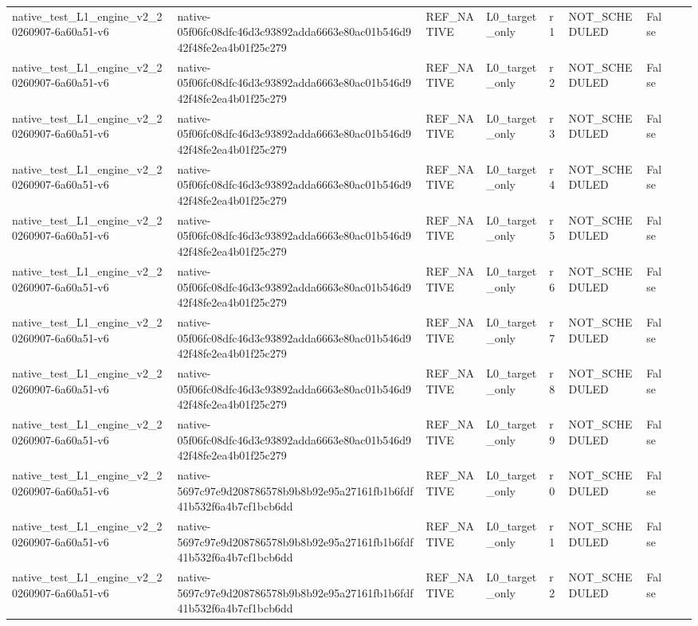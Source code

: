 \begin{tabular}{lllllllll}
native\_test\_L1\_engine\_v2\_20260907-6a60a51-v6 & native-05f06fc08dfc46d3c93892adda6663e80ac01b546d942f48fe2ea4b01f25c279 & REF\_NATIVE & L0\_target\_only & r1 & NOT\_SCHEDULED & False &  &  \\
native\_test\_L1\_engine\_v2\_20260907-6a60a51-v6 & native-05f06fc08dfc46d3c93892adda6663e80ac01b546d942f48fe2ea4b01f25c279 & REF\_NATIVE & L0\_target\_only & r2 & NOT\_SCHEDULED & False &  &  \\
native\_test\_L1\_engine\_v2\_20260907-6a60a51-v6 & native-05f06fc08dfc46d3c93892adda6663e80ac01b546d942f48fe2ea4b01f25c279 & REF\_NATIVE & L0\_target\_only & r3 & NOT\_SCHEDULED & False &  &  \\
native\_test\_L1\_engine\_v2\_20260907-6a60a51-v6 & native-05f06fc08dfc46d3c93892adda6663e80ac01b546d942f48fe2ea4b01f25c279 & REF\_NATIVE & L0\_target\_only & r4 & NOT\_SCHEDULED & False &  &  \\
native\_test\_L1\_engine\_v2\_20260907-6a60a51-v6 & native-05f06fc08dfc46d3c93892adda6663e80ac01b546d942f48fe2ea4b01f25c279 & REF\_NATIVE & L0\_target\_only & r5 & NOT\_SCHEDULED & False &  &  \\
native\_test\_L1\_engine\_v2\_20260907-6a60a51-v6 & native-05f06fc08dfc46d3c93892adda6663e80ac01b546d942f48fe2ea4b01f25c279 & REF\_NATIVE & L0\_target\_only & r6 & NOT\_SCHEDULED & False &  &  \\
native\_test\_L1\_engine\_v2\_20260907-6a60a51-v6 & native-05f06fc08dfc46d3c93892adda6663e80ac01b546d942f48fe2ea4b01f25c279 & REF\_NATIVE & L0\_target\_only & r7 & NOT\_SCHEDULED & False &  &  \\
native\_test\_L1\_engine\_v2\_20260907-6a60a51-v6 & native-05f06fc08dfc46d3c93892adda6663e80ac01b546d942f48fe2ea4b01f25c279 & REF\_NATIVE & L0\_target\_only & r8 & NOT\_SCHEDULED & False &  &  \\
native\_test\_L1\_engine\_v2\_20260907-6a60a51-v6 & native-05f06fc08dfc46d3c93892adda6663e80ac01b546d942f48fe2ea4b01f25c279 & REF\_NATIVE & L0\_target\_only & r9 & NOT\_SCHEDULED & False &  &  \\
native\_test\_L1\_engine\_v2\_20260907-6a60a51-v6 & native-5697c97e9d208786578b9b8b92e95a27161fb1b6fdf41b532f6a4b7cf1bcb6dd & REF\_NATIVE & L0\_target\_only & r0 & NOT\_SCHEDULED & False &  &  \\
native\_test\_L1\_engine\_v2\_20260907-6a60a51-v6 & native-5697c97e9d208786578b9b8b92e95a27161fb1b6fdf41b532f6a4b7cf1bcb6dd & REF\_NATIVE & L0\_target\_only & r1 & NOT\_SCHEDULED & False &  &  \\
native\_test\_L1\_engine\_v2\_20260907-6a60a51-v6 & native-5697c97e9d208786578b9b8b92e95a27161fb1b6fdf41b532f6a4b7cf1bcb6dd & REF\_NATIVE & L0\_target\_only & r2 & NOT\_SCHEDULED & False &  &  \\

\end{tabular}
